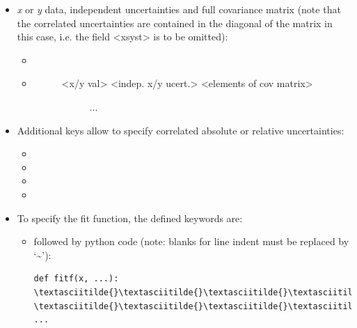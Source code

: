 \documentclass[a4paper,10pt,english]{sphinxmanual}
\begin{document}
\begin{fulllineitems}
\begin{itemize}
\item {} 
\emph{x} or \emph{y} data, independent uncertainties and full covariance matrix (note
that the correlated uncertainties are contained in the diagonal of the
matrix in this case, i.e. the field \textless{}xsyst\textgreater{} is to be omitted):
\begin{itemize}
\item {} 

\item {} \begin{description}
\item[{}] \leavevmode\begin{description}
\item[{\textless{}x/y val\textgreater{}  \textless{}indep. x/y ucert.\textgreater{}  \textless{}elements of cov matrix\textgreater{}}] \leavevmode
...

\end{description}

\end{description}

\end{itemize}

\item {} 
Additional keys allow to specify correlated absolute or relative
uncertainties:
\begin{itemize}
\item {} 

\item {} 

\item {} 

\item {} 

\end{itemize}

\item {} 
To specify the fit function, the defined keywords are:
\begin{itemize}
\item {} 
  followed by python code (note: blanks for line
indent must be replaced by `\textasciitilde{}'):

\begin{Verbatim}[commandchars=\\\{\}]
def fitf(x, ...):
\textasciitilde{}\textasciitilde{}\textasciitilde{}\textasciitilde{}...
\textasciitilde{}\textasciitilde{}\textasciitilde{}\textasciitilde{}return ...
\end{Verbatim}


\end{itemize}
\end{itemize}
\end{fulllineitems}
\end{document}
